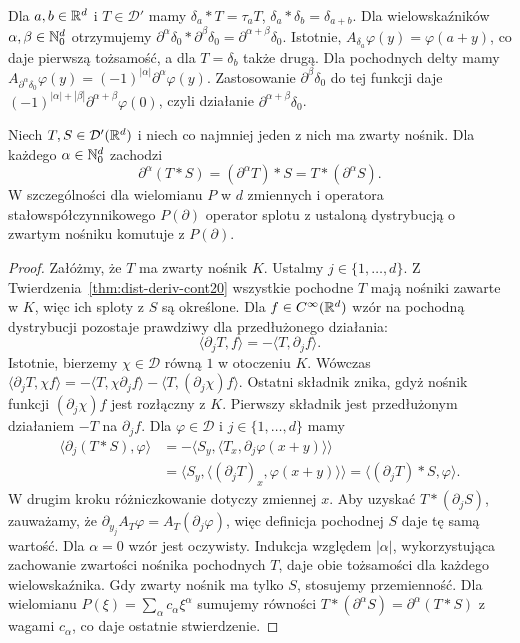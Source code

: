 \begin{przyklad}
\label{ex:delta-convolution21}
Dla $a,b\in\mathbb R^d$ i $T\in\mathcal D'$ mamy
$\delta_a*T=\tau_aT$, $\delta_a*\delta_b=\delta_{a+b}$.
Dla wielowskaźników $\alpha,\beta\in\mathbb N_0^d$ otrzymujemy
$\partial^\alpha\delta_0*\partial^\beta\delta_0
=\partial^{\alpha+\beta}\delta_0$.
Istotnie, $A_{\delta_a}\varphi(y)=\varphi(a+y)$,
co daje pierwszą tożsamość, a dla $T=\delta_b$
także drugą. Dla pochodnych delty mamy
$A_{\partial^\alpha\delta_0}\varphi(y)
=(-1)^{|\alpha|}\partial^\alpha\varphi(y)$.
Zastosowanie $\partial^\beta\delta_0$ do tej funkcji
daje $(-1)^{|\alpha|+|\beta|}
\partial^{\alpha+\beta}\varphi(0)$, czyli działanie
$\partial^{\alpha+\beta}\delta_0$.
\end{przyklad}

\begin{twierdzenie}
\label{thm:convolution-derivative21}
Niech $T,S\in\mathcal D'(\mathbb R^d)$ i niech co najmniej
jeden z nich ma zwarty nośnik. Dla każdego
$\alpha\in\mathbb N_0^d$ zachodzi
\[
 \partial^\alpha(T*S)
 =(\partial^\alpha T)*S
 =T*(\partial^\alpha S).
\]
W szczególności dla wielomianu $P$ w $d$ zmiennych
i operatora stałowspółczynnikowego $P(\partial)$
operator splotu z ustaloną dystrybucją o zwartym
nośniku komutuje z $P(\partial)$.
\end{twierdzenie}
\begin{proof}
Załóżmy, że $T$ ma zwarty nośnik $K$. Ustalmy
$j\in\{1,\ldots,d\}$.
Z Twierdzenia~\ref{thm:dist-deriv-cont20} wszystkie
pochodne $T$ mają nośniki zawarte w $K$, więc ich sploty
z $S$ są określone. Dla $f\in C^\infty(\mathbb R^d)$
wzór na pochodną dystrybucji pozostaje prawdziwy
dla przedłużonego działania:
\[
 \langle\partial_jT,f\rangle
 =-\langle T,\partial_jf\rangle.
\]
Istotnie, bierzemy $\chi\in\mathcal D$ równą $1$
w otoczeniu $K$. Wówczas
$\langle\partial_jT,\chi f\rangle
=-\langle T,\chi\partial_jf\rangle
-\langle T,(\partial_j\chi)f\rangle$.
Ostatni składnik znika, gdyż nośnik funkcji
$(\partial_j\chi)f$ jest rozłączny z $K$.
Pierwszy składnik jest przedłużonym działaniem
$-T$ na $\partial_jf$. Dla
$\varphi\in\mathcal D$ i $j\in\{1,\ldots,d\}$ mamy
\[
 \begin{aligned}
 \langle\partial_j(T*S),\varphi\rangle
 &=-\langle S_y,\langle T_x,\partial_j\varphi(x+y)\rangle\rangle\\
 &=\langle S_y,\langle(\partial_jT)_x,\varphi(x+y)\rangle\rangle
 =\langle(\partial_jT)*S,\varphi\rangle.
 \end{aligned}
\]
W drugim kroku różniczkowanie dotyczy zmiennej $x$.
Aby uzyskać $T*(\partial_jS)$, zauważamy, że
$\partial_{y_j}A_T\varphi=A_T(\partial_j\varphi)$,
więc definicja pochodnej $S$ daje tę samą wartość.
Dla $\alpha=0$ wzór jest oczywisty. Indukcja względem
$|\alpha|$, wykorzystująca zachowanie zwartości nośnika
pochodnych $T$, daje obie tożsamości dla każdego
wielowskaźnika. Gdy zwarty nośnik ma tylko $S$,
stosujemy przemienność. Dla wielomianu
$P(\xi)=\sum_\alpha c_\alpha\xi^\alpha$ sumujemy
równości $T*(\partial^\alpha S)=\partial^\alpha(T*S)$
z wagami $c_\alpha$, co daje ostatnie stwierdzenie.
\end{proof}

